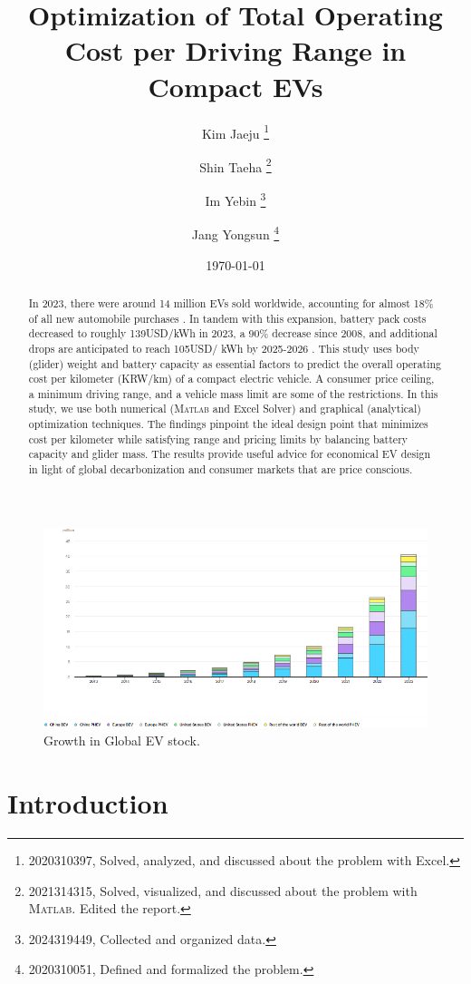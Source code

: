 \documentclass[11pt,twocolumn]{article}
\title{\textbf{Optimization of Total Operating Cost per Driving Range in Compact EVs}}
\author{Kim Jaeju \thanks{2020310397, Solved, analyzed, and discussed about the problem with Excel.} \and Shin Taeha \thanks{2021314315, Solved, visualized, and discussed about the problem with \textsc{Matlab}. Edited the report.} \and Im Yebin \thanks{2024319449, Collected and organized data.} \and Jang Yongsun \thanks{2020310051, Defined and formalized the problem.}}
\date{\today}
\begin{document}
    \begin{titlepage}
        \maketitle
        \begin{abstract}
            In 2023, there were around 14 million EVs sold worldwide, accounting for almost 18\% of all new automobile purchases \cite{iea24}.
            In tandem with this expansion, battery pack costs decreased to roughly 139USD/kWh in 2023, a 90\% decrease since 2008, and additional drops are anticipated to reach 105USD/ kWh by 2025-2026 \cite{iea24}\cite{doe23}.
            This study uses body (glider) weight and battery capacity as essential factors to predict the overall operating cost per kilometer (KRW/km) of a compact electric vehicle.
            A consumer price ceiling, a minimum driving range, and a vehicle mass limit are some of the restrictions.
            In this study, we use both numerical (\textsc{Matlab} and Excel Solver) and graphical (analytical) optimization techniques.
            The findings pinpoint the ideal design point that minimizes cost per kilometer while satisfying range and pricing limits by balancing battery capacity and glider mass.
            The results provide useful advice for economical EV design in light of global decarbonization and consumer markets that are price conscious.
        \end{abstract}
    \end{titlepage}
    \begin{figure}[h]
        \centering
        \includegraphics[width=0.8\columnwidth]{growth.png}
        \caption{Growth in Global EV stock.}
        \label{growth}
    \end{figure}
    \section{Introduction}
\end{document}
